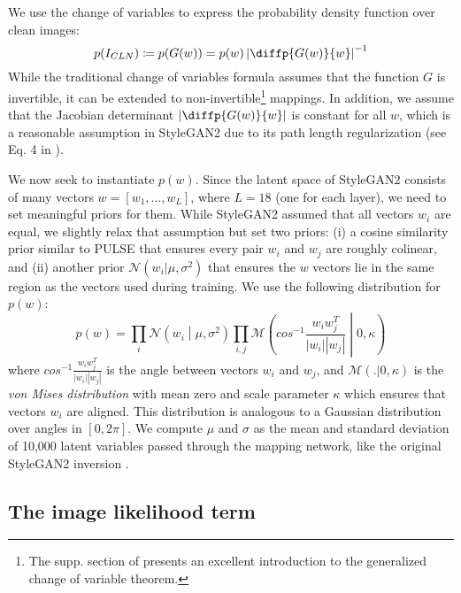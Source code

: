 \documentclass{article}
\begin{document}
We use the change of variables to express the probability density function over clean images:
\begin{equation}
 \label{changeofvar}
 p(I_{CLN}) \coloneqq p(G(w)) = p(w) \left|\diffp{G(w)}{w} \right|^{-1}
\end{equation}
While the traditional change of variables formula assumes that the function $G$ is invertible, it can be extended to non-invertible\footnote{The supp. section of \cite{cvitkovic2019minimal} presents an excellent introduction to the generalized change of variable theorem.} mappings\cite{cvitkovic2019minimal,krantz2008geometric}. In addition, we assume that the Jacobian determinant $\left|\diffp{G(w)}{w}\right|$ is constant for all $w$, which is a reasonable assumption in StyleGAN2 due to its path length regularization (see Eq. 4 in \cite{karras2020analyzing}).

We now seek to instantiate $p(w)$. Since the latent space of StyleGAN2 consists of many vectors $w = [w_1, \dots, w_L]$, where $L=18$ (one for each layer), we need to set meaningful priors for them. While StyleGAN2 assumed that all vectors $w_i$ are equal, we slightly relax that assumption but set two priors: (i) a cosine similarity prior similar to PULSE \cite{menon2020pulse} that ensures every pair $w_i$ and $w_j$ are roughly colinear, and (ii) another prior $\mathcal{N}(w_i|\mu, \sigma^2)$ that ensures the $w$ vectors lie in the same region as the vectors used during training. We use the following distribution for $p(w)$:
\begin{equation}
\label{priordef}
p(w) = \prod_i \mathcal{N}\left(w_i\middle|\mu, \sigma^2\right) \prod_{i,j} \mathcal{M}\left(cos^{-1}\frac{w_iw_j^T}{|w_i| |w_j|}\middle|0, \kappa\right) 
\end{equation}
where $cos^{-1}\frac{w_iw_j^T}{|w_i| |w_j|}$ is the angle between vectors $w_i$ and $w_j$, and $\mathcal{M}(.|0, \kappa)$ is the \emph{von Mises distribution} with mean zero and scale parameter $\kappa$ which ensures that vectors $w_i$ are aligned. This distribution is analogous to a Gaussian distribution over angles in $[0, 2\pi]$. We compute $\mu$ and $\sigma$ as the mean and standard deviation of 10,000 latent variables passed through the mapping network, like the original StyleGAN2 inversion \cite{karras2020analyzing}.

\subsection{The image likelihood term}
\label{likelihood}
\end{document}
